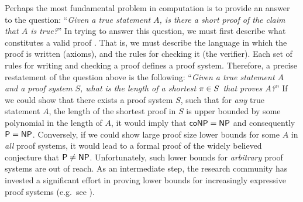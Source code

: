 \documentclass[11pt]{article}
\begin{document}
Perhaps the most fundamental problem in computation is to provide an answer to the question: ``\textit{Given a true statement $A$, is there a short proof of the claim that $A$ is true?}''
In trying to answer this question, we must first describe what constitutes a valid proof \cite{cook1979relative}. That is, we must describe the language in which the proof is written (axioms), and the rules for checking it (the verifier).
Each set of rules for writing and checking a proof defines a proof system.
Therefore, a precise restatement of the question above is the following:  ``\textit{Given a true statement $A$ and a proof system $S$, what is the length of a shortest $\pi \in S$ that proves $A$?}''
If we could show that there exists a proof system $S$, such that for \emph{any} true statement $A$, the length of the shortest proof in $S$ is upper bounded by some polynomial in the length of $A$, it would imply that $\mathsf{coNP} = \mathsf{NP}$ and consequently $\mathsf{P} = \mathsf{NP}$. 
Conversely, if we could show large proof size lower bounds for some $A$ in \emph{all} proof systems, it would lead to a formal proof of the widely believed conjecture that $\mathsf{P} \neq \mathsf{NP}$.
Unfortunately, such lower  bounds for \emph{arbitrary} proof systems are out of reach.
As an intermediate step,
the research community has invested a significant effort in proving lower bounds for increasingly expressive proof systems (e.g.\ see \citep{alekhnovich2001lower,buss1999linear,impagliazzo1999lower,razborov1998lower}). 

\end{document}
